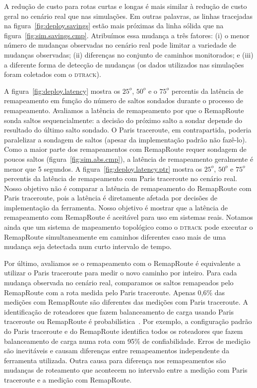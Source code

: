 \documentclass{JBCS}
\newcommand{\dtrack}{\textsc{dtrack}}
\newcommand{\rmprt}{{Re\-map\-Rou\-te}}
\newcommand{\figstr}{figura}
\begin{document}
A redução de custo para rotas curtas e longas é mais similar à redução
de custo geral no cenário real que nas simulações.  Em outras palavras,
as linhas tracejadas na \figstr~\ref{fig:deploy.savings} estão mais
próximas da linha sólida que na \figstr~\ref{fig:sim.savings.cmp}.
Atribuímos essa mudança a três fatores: (i) o menor número de mudanças
observadas no cenário real pode limitar a variedade de mudanças
observadas; (ii) diferenças no conjunto de caminhos monitorados; e (iii)
a diferente forma de detecção de mudanças (os dados utilizados nas
simulações foram coletados com o \dtrack{}).

A \figstr~\ref{fig:deploy.latency} mostra os $25^o$, $50^o$ e o $75^o$
percentis da latência de remapeamento em função do número de saltos
sondados durante o processo de remapeamento.  Avaliamos a latência de
remapeamento por que o \rmprt{} sonda saltos sequencialmente: a decisão
do próximo salto a sondar depende do resultado do último salto sondado.
O Paris traceroute, em contrapartida, poderia paralelizar a sondagem de
saltos (apesar da implementação padrão não fazê-lo).  Como a maior parte
dos remapeamentos com \rmprt{} requer sondagem de poucos saltos
(\figstr~\ref{fig:sim.abs.cmp}), a latência de remapeamento geralmente é
menor que 5 segundos.  A \figstr~\ref{fig:deploy.latency.ptr} mostra os
$25^o$, $50^o$ e $75^o$ percentis da latência de remapeamento com Paris
traceroute no cenário real.  Nosso objetivo não é comparar a latência de
remapeamento do \rmprt{} com Paris traceroute, pois a latência é
diretamente afetada por decisões de implementação da ferramenta.  Nosso
objetivo é mostrar que a latência de remapeamento com \rmprt{} é
aceitável para uso em sistemas reais.  Notamos ainda que um sistema de
mapeamento topológico como o \dtrack{} pode executar o \rmprt{}
simultaneamente em caminhos diferentes caso mais de uma mudança seja
detectada num curto intervalo de tempo.

Por último, avaliamos se o remapeamento com o \rmprt{} é equivalente a
utilizar o Paris traceroute para medir o novo caminho por inteiro.  Para
cada mudança observada no cenário real, comparamos os saltos remapeados
pelo \rmprt{} com a rota medida pelo Paris traceroute.  Apenas 0,6\% das
medições com \rmprt{} são diferentes das medições com Paris traceroute.
A identificação de roteadores que fazem balanceamento de carga usando
Paris traceroute ou \rmprt{} é probabilística~\cite{veitch09balancer}.
Por exemplo, a configuração padrão do Paris traceroute e do \rmprt{}
identifica todos os roteadores que fazem balanceamento de carga numa
rota com 95\% de confiabilidade.  Erros de medição são inevitáveis e
causam diferenças entre remapeamentos independente da ferramenta
utilizada.  Outra causa para diferença nos remapeamentos são mudanças de
roteamento que acontecem no intervalo entre a medição com Paris
traceroute e a medição com \rmprt{}.
\end{document}
